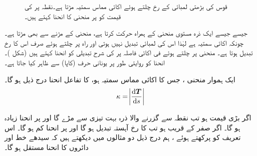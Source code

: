 \begin{figure}
\begin{minipage}{0.55\textwidth}
\label{شکل_سمتی_تفاعل_چھوکٹ}
\end{minipage}\hfill
\begin{minipage}{0.40\textwidth}
\centering
{}
\caption
{قوس  کی بڑھتی لمبائی  کے رخ چلتے ہوئے اکائی مماس سمتیہ  مڑتا ہے۔نقطہ  پر  کی قیمت کو  پر منحنی کا انحنا کہتے ہیں۔}
\label{شکل_سمتی_تفاعل_ریل_گاڑی}
\end{minipage}
\end{figure}

جیسے جیسے ایک ذرہ مستوی منحنی  کے ہمراہ حرکت کرتا ہے، منحنی کے مڑنے سے   بھی مڑتا ہے۔ چونکہ  اکائی سمتیہ ہے لہٰذا اس کی لمبائی تبدیل نہیں ہوتی  اور راہ پر چلتے ہوئے  صرف اس کا رخ تبدیل ہوتا ہے۔ منحنی پر چلتے ہوئے  فی اکائی فاصلہ پر    کی شرح تبدیلی کو انحنا کہتے ہیں (شکل )۔ انحنا کو روایتی طور پر یونانی حرف   (کاپا) سے ظاہر کیا جاتا ہے۔

 ایک  ہموار منحنی ، جس  کا اکائی مماس سمتیہ   ہو، کا تفاعل انحنا درج ذیل ہو گا۔
\begin{align*}
\kappa=\abs{\frac{\dif \kvec{T}}{\dif s}}
\end{align*}

اگر  بڑی قیمت ہو تب نقطہ  سے گزرنے والا ذرہ بہت تیزی سے مڑے گا اور  پر انحنا زیادہ ہو گا۔ اگر  صفر کے قریب ہو تب  کا رخ آہستہ تبدیل ہو گا اور  پر انحنا کم ہو گا۔ اس تعریف کو  پرکھتے ہوئے  ، ہم درج ذیل دو مثالوں میں دیکھتے ہیں کہ سیدھے خط اور دائروں کا انحنا  مستقل ہو گا۔

